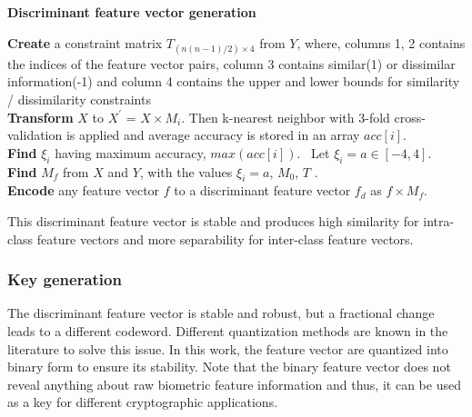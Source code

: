 \begin{algorithm}
	\caption{\textbf{Discriminant feature vector generation}}
	\label{algo2}
	\SetAlgoLined 
	\SetAlgoVlined 
	\LinesNumbered
	\DontPrintSemicolon
	\textbf{Create} a constraint matrix $T_{(n(n-1)/2) \times 4}$ from $Y$, \linebreak
	where, columns 1, 2 contains the indices of the feature vector pairs,\linebreak
	column 3 contains similar(1) or dissimilar information(-1) and \linebreak
	column 4 contains the upper and lower bounds for similarity / dissimilarity
	constraints  \\
	\textbf{Transform} $X$ to $X^{\prime}$ = $X \times M_{i}$. \linebreak
	Then k-nearest neighbor with 3-fold cross-validation is applied and \linebreak 
	average accuracy is stored in an array $acc[i]$.\\
	\textbf{Find} $\xi_{i}$ having maximum accuracy, $max(acc[i])$.\linebreak
	~Let $\xi_{i}=a \in [-4,4]$.\\
	\textbf{Find} $M_{f}$ from $X$ and $Y$, with the values $\xi_{i}=a$, $M_{0}$, $T$ .\\
	\textbf{Encode} any feature vector $f$ to a discriminant feature
	vector $f_{d}$ as $f \times M_{f}$.\\

\end{algorithm}\par

This discriminant feature vector is stable and produces high similarity for
intra-class feature vectors and more separability for inter-class feature
vectors.

\subsubsection{Key generation}\label{bk} The discriminant feature vector is stable
and robust, but a fractional change leads to a different codeword. Different
quantization methods are known in the literature to solve this issue. In this
work, the feature vector are quantized into binary form to ensure its stability.
Note that the binary feature vector does not reveal anything about raw biometric
feature information and thus, it can be used as a key for different
cryptographic applications.\par

